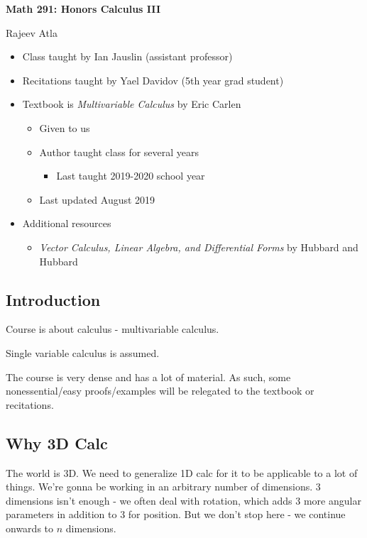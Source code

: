 \documentclass[11pt]{article}
\begin{document}
\begin{center}
    \Large \textbf{Math 291: Honors Calculus III}
\end{center}
\begin{center}
    \Large Rajeev Atla
\end{center}

\begin{itemize}
\item Class taught by Ian Jauslin (assistant professor)
\item Recitations taught by Yael Davidov (5th year grad student)
\item Textbook is \emph{Multivariable Calculus} by Eric Carlen \cite{carlen}
  \begin{itemize}
  \item Given to us
  \item Author taught class for several years
    \begin{itemize}
    \item Last taught 2019-2020 school year
    \end{itemize}
  \item Last updated August 2019
  \end{itemize}
\item Additional resources
  \begin{itemize}
  \item \emph{Vector Calculus, Linear Algebra, and Differential Forms} by Hubbard and Hubbard \cite{hubbard}
  \end{itemize}
\end{itemize}

\newpage

\doublespacing
\tableofcontents
\singlespacing


\subsection{Introduction}
Course is about calculus - multivariable calculus.

Single variable calculus is assumed.

The course is very dense and has a lot of material.
As such, some nonessential/easy proofs/examples will be relegated to the textbook or recitations.


\subsection{Why 3D Calc}
The world is 3D.
We need to generalize 1D calc for it to be applicable to a lot of things.
We're gonna be working in an arbitrary number of dimensions.
3 dimensions isn't enough - we often deal with rotation, which adds 3 more angular parameters in addition to 3 for position.
But we don't stop here - we continue onwards to $n$ dimensions.
\end{document}
